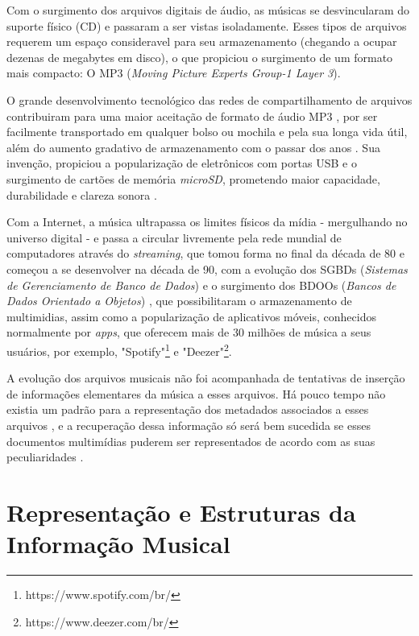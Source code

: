 Com o surgimento dos arquivos digitais de áudio, as músicas se desvincularam do suporte físico (CD) e passaram a ser vistas isoladamente. Esses tipos de arquivos requerem um espaço consideravel para seu armazenamento (chegando a ocupar dezenas de megabytes em disco), o que propiciou o surgimento de um formato mais compacto: O MP3 (\textit{Moving Picture Experts Group-1 Layer 3}).

O grande desenvolvimento tecnológico das redes de compartilhamento de arquivos contribuiram para uma maior aceitação de formato de áudio MP3 \cite{andrade&crispim2008}, por ser facilmente transportado em qualquer bolso ou mochila e pela sua longa vida útil, além do aumento gradativo de armazenamento com o passar dos anos \cite{marchi2005}. Sua invenção, propiciou a popularização de eletrônicos com portas USB e o surgimento de cartões de memória \textit{microSD}, prometendo maior capacidade, durabilidade e clareza sonora \cite{marchi2005}.

Com a Internet, a música ultrapassa os limites físicos da mídia - mergulhando no universo digital - e passa a circular livremente pela rede mundial de computadores através do \textit{streaming}, que tomou forma no final da década de 80 e começou a se desenvolver na década de 90, com a evolução dos SGBDs (\textit{Sistemas de Gerenciamento de Banco de Dados}) e o surgimento dos BDOOs (\textit{Bancos de Dados Orientado a Objetos}) \cite{junior&segundo2008}, que possibilitaram o armazenamento de multimidias, assim como a popularização de aplicativos móveis, conhecidos normalmente por \textit{apps}, que oferecem mais de 30 milhões de música a seus usuários, por exemplo, "Spotify"\footnote{https://www.spotify.com/br/} e "Deezer"\footnote{https://www.deezer.com/br/}.

A evolução dos arquivos musicais não foi acompanhada de tentativas de inserção de informações elementares da música a esses arquivos. Há pouco tempo não existia um padrão para a representação dos metadados associados a esses arquivos \cite{andrade&crispim2008}, e a recuperação dessa informação só será bem sucedida se esses documentos multimídias puderem ser representados de acordo com as suas peculiaridades \cite{gomes2015}.

\section{Representação e Estruturas da Informação Musical} \label{formatos}

